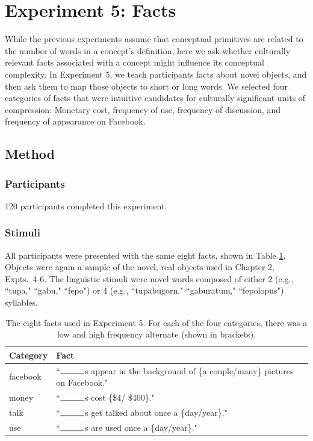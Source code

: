 \section{Experiment 5: Facts}
While the previous experiments assume that conceptual primitives are related to the number of words in a concept's definition, here we ask whether culturally relevant facts associated with a concept might influence its conceptual complexity. In Experiment 5,  we teach participants facts about novel objects, and then ask them to map those objects to short or long words. We selected four categories of facts  that were intuitive candidates for culturally significant units of compression: Monetary cost, frequency of use, frequency of discussion, and frequency of appearance on Facebook.

\subsection{Method}



\subsubsection{Participants}
120 participants completed this experiment. 
\subsubsection{Stimuli}
All participants were presented with the same eight facts, shown in Table \ref{tab:facts}. Objects were again a sample of the novel, real objects used in Chapter 2, Expts.\ 4-6.  The linguistic stimuli were novel words composed of either 2 (e.g., ``tupa," ``gabu," ``fepo")  or 4  (e.g., ``tupabugorn," ``gaburatum," ``fepolopus")  syllables.

\begin{table}[t!]
\centering

\begin{tabular}{ll}
\toprule
\textbf{Category} & \textbf{Fact}               \\
\toprule
   facebook & ``$\rule{1cm}{0.15mm}$s appear in the background of \{a couple/many\} pictures on Facebook."\\
   money  &  ``$\rule{1cm}{0.15mm}$s cost \{\$4/ \$400\}."   \\
   talk  & ``$\rule{1cm}{0.15mm}$s get talked about once a \{day/year\}." \\
   use    & ``$\rule{1cm}{0.15mm}$s are used once a \{day/year\}."                             \\

 \bottomrule
\end{tabular}
\caption{The eight facts used in Experiment 5. For each of the four categories, there was a low and high frequency alternate (shown in  brackets).}
\label{tab:facts}
\end{table}

